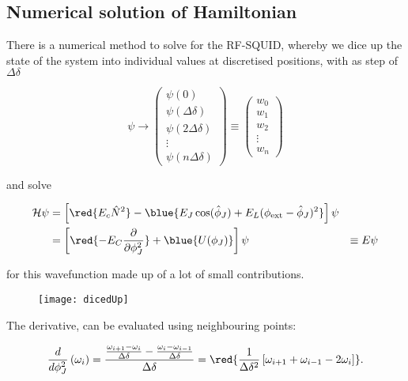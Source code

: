 \newpage
\subsection{Numerical                   solution                   of
  Hamiltonian\label{subsec:flux_numerical}}
There is  a numerical method  to solve  for the RF-SQUID,  whereby we
dice up the state of the system into individual values at discretised
positions, with as step of $ \Delta \delta $

\[
  \psi \rightarrow \begin{pmatrix}
    \psi(0)\\
    \psi(\Delta \delta)\\
    \psi(2\Delta \delta)\\\vdots
    \\
    \psi(n\Delta \delta)
  \end{pmatrix}
  \equiv
  \begin{pmatrix}
    w_0\\
    w_1\\
    w_2\\
    \vdots\\
    w_{n}
  \end{pmatrix}
\]

\noindent and solve

\begin{equation}\label{eqn:flux_1}
  \begin{aligned}
    \mathcal{H}     \psi    &     =    \left[\red{E_c\hat{N}^2}     -
      \blue{E_J\cos(\hat{\phi}_J) +
        E_L(\phi_\text{ext}-\hat{\phi}_J)^2} \right]\psi\\
    &    =     \left[\red{-E_C\frac{\partial}{\partial\phi_J^2}}    +
      \blue{U(\phi_J)}\right]\psi &\equiv E\psi
  \end{aligned}
\end{equation}

\noindent  for  this   wavefunction  made  up  of  a   lot  of  small
contributions.

\begin{figure}[h]
  \centering \texttt{[image: dicedUp]}
\end{figure}

\noindent

\noindent The derivative, can be evaluated using neighbouring points:

   \begin{equation}\label{eqn:flux_2}
     \frac{d}{d\phi_J^2}\left(\omega_i\right) = \frac{\frac{\omega_{i+1} - \omega_i}{\Delta\delta} - \frac{\omega_{i} - \omega_{i-1}}{\Delta\delta}}{\Delta\delta} = \red{\frac{1}{\Delta\delta^2}\left[\omega_{i+1}+\omega_{i-1}-2\omega_{i}\right]}.
   \end{equation}

